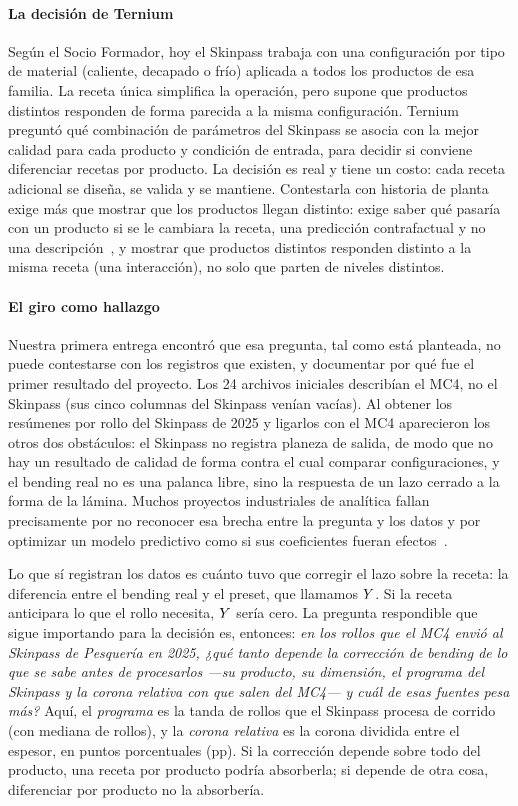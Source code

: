 \paragraph{La decisión de Ternium}
Según el Socio Formador, hoy el Skinpass trabaja con una configuración por tipo de material (caliente, decapado o frío) aplicada a todos los
productos de esa familia. La receta única simplifica la operación, pero supone que productos distintos responden de
forma parecida a la misma configuración. Ternium preguntó qué combinación de parámetros del Skinpass se asocia con la
mejor calidad para cada producto y condición de entrada, para decidir si conviene diferenciar recetas por producto.
La decisión es real y tiene un costo: cada receta adicional se diseña, se valida y se mantiene. Contestarla con
historia de planta exige más que mostrar que los productos llegan distinto: exige saber qué pasaría con un producto si
se le cambiara la receta, una predicción contrafactual y no una descripción~\cite{hernan2019}, y mostrar que productos
distintos responden distinto a la misma receta (una interacción), no solo que parten de niveles distintos.

\paragraph{El giro como hallazgo}
Nuestra primera entrega encontró que esa pregunta, tal como está planteada, no puede contestarse con los registros
que existen, y documentar por qué fue el primer resultado del proyecto. Los 24 archivos iniciales describían el MC4,
no el Skinpass (sus cinco columnas del Skinpass venían vacías). Al obtener los resúmenes por rollo del Skinpass de
2025 y ligarlos con el MC4 aparecieron los otros dos obstáculos: el Skinpass no registra planeza de salida, de modo
que no hay un resultado de calidad de forma contra el cual comparar configuraciones, y el bending real no es una
palanca libre, sino la respuesta de un lazo cerrado a la forma de la lámina. Muchos proyectos industriales de
analítica fallan precisamente por no reconocer esa brecha entre la pregunta y los datos y por optimizar un modelo
predictivo como si sus coeficientes fueran efectos~\cite{box1966,shmueli2010}.

Lo que sí registran los datos es cuánto tuvo que corregir el lazo sobre la receta: la diferencia entre el bending
real y el preset, que llamamos $Y$. Si la receta anticipara lo que el rollo necesita, $Y$ sería cero. La pregunta
respondible que sigue importando para la decisión es, entonces:
\emph{en los rollos que el MC4 envió al Skinpass de Pesquería en 2025, ¿qué tanto depende la corrección de bending
de lo que se sabe antes de procesarlos ---su producto, su dimensión, el programa del Skinpass y la corona relativa
con que salen del MC4--- y cuál de esas fuentes pesa más?} Aquí, el \emph{programa} es la tanda de rollos que el
Skinpass procesa de corrido (con mediana de \MedianaRollosPrograma{} rollos), y la \emph{corona relativa} es la corona
dividida entre el espesor, en puntos porcentuales (pp). Si la corrección depende sobre todo del producto, una receta
por producto podría absorberla; si depende de otra cosa, diferenciar por producto no la absorbería.

